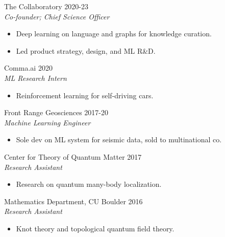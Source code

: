 \documentclass[margin]{res}
\begin{document}
\begin{resume}
                The Collaboratory \hfill 2020-23 \\
                 {\sl Co-founder; Chief Science Officer}
                 \begin{itemize}  \itemsep -2pt %
                 \item Deep learning on language and graphs for knowledge curation.
                 \item Led product strategy, design, and ML R\&D.
                 \end{itemize}

                 Comma.ai \hfill            2020 \\
		{\sl ML Research Intern}
                 \begin{itemize}  \itemsep -2pt %
                 \item Reinforcement learning for self-driving cars.
                 \end{itemize}

               Front Range Geosciences \hfill            2017-20 \\
                 {\sl Machine Learning Engineer}
                 \begin{itemize}  \itemsep -2pt %
                 \item Sole dev on ML system for seismic data, sold to multinational co.
                 \end{itemize}
                 Center for Theory of Quantum Matter \hfill            2017 \\
		{\sl Research Assistant}
                 \begin{itemize}  \itemsep -2pt %
                 \item Research on quantum many-body localization.
                 \end{itemize}

                Mathematics Department, CU Boulder \hfill            2016 \\
		 {\sl Research Assistant}
                 \begin{itemize}  \itemsep -2pt %
                 \item Knot theory and topological quantum field theory.
                 \end{itemize}


\end{resume}
\end{document}
